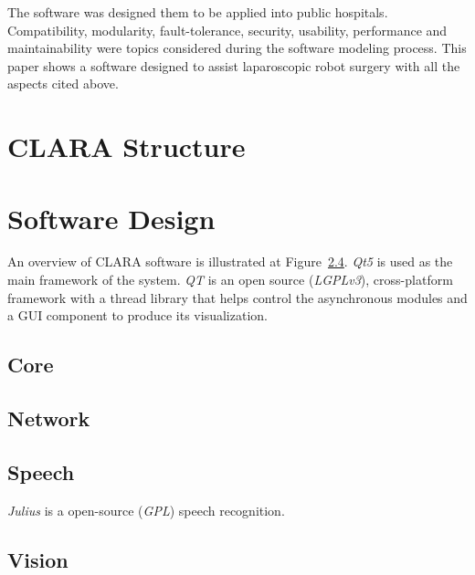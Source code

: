 \documentclass{svproc}
\begin{document}
\begin{multicols}{2}
 	
 	The software was designed them to be applied into public hospitals. Compatibility, modularity, fault-tolerance, security, usability, performance and maintainability were topics considered during the software modeling process. This paper shows a software designed to assist laparoscopic robot surgery with all the aspects cited above.
 	
	\section{CLARA Structure}
	
	
	
	
	\section{Software Design}
	
	An overview of CLARA software is illustrated at Figure~\ref{}. \textit{Qt5}\cite{qt} is used as the main framework of the system. \textit{QT} is an open source (\textit{LGPLv3}\cite{lgpl}), cross-platform framework with a thread library that helps control the asynchronous modules and a GUI component to produce its visualization.
	
	\subsection{Core}
	
	
		
	\subsection{Network}
		
	\subsection{Speech}
	
	\textit{Julius}\cite{lee2009recent} is a open-source (\textit{GPL}\cite{gpl}) speech recognition.
	
	\subsection{Vision}
	

\end{multicols}
\end{document}
